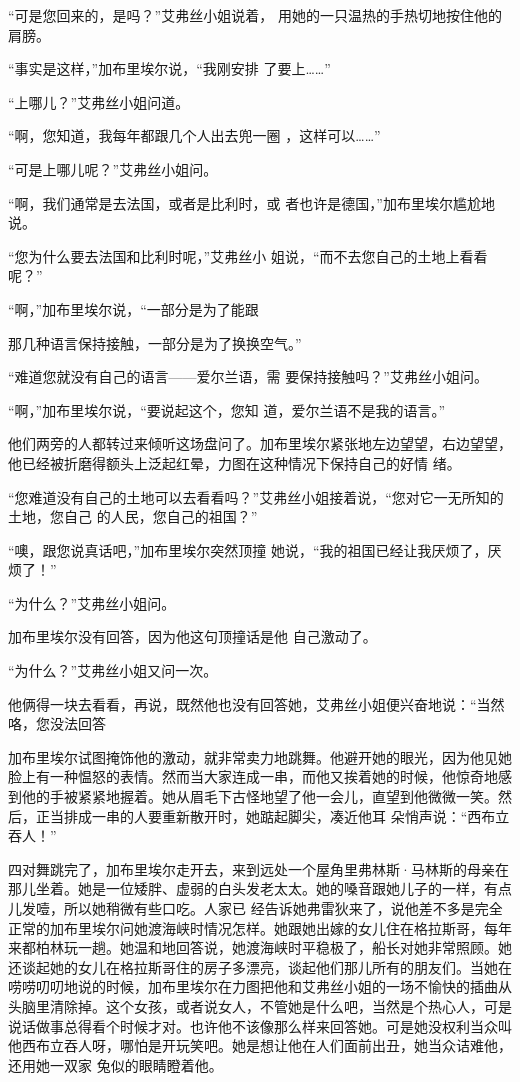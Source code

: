 \documentclass{article}
\begin{document}
“可是您回来的，是吗？”艾弗丝小姐说着，
用她的一只温热的手热切地按住他的肩膀。 

“事实是这样，”加布里埃尔说，“我刚安排
了要上……” 


“上哪儿？”艾弗丝小姐问道。 

“啊，您知道，我每年都跟几个人出去兜一圈
，这样可以……” 


“可是上哪儿呢？”艾弗丝小姐问。 

“啊，我们通常是去法国，或者是比利时，或
者也许是德国，”加布里埃尔尴尬地说。 

“您为什么要去法国和比利时呢，”艾弗丝小
姐说，“而不去您自己的土地上看看呢？” 

“啊，”加布里埃尔说，“一部分是为了能跟
\newpage

那几种语言保持接触，一部分是为了换换空气。” 

“难道您就没有自己的语言——爱尔兰语，需
要保持接触吗？”艾弗丝小姐问。 

“啊，”加布里埃尔说，“要说起这个，您知
道，爱尔兰语不是我的语言。” 

他们两旁的人都转过来倾听这场盘问了。加布里埃尔紧张地左边望望，右边望望，他已经被折磨得额头上泛起红晕，力图在这种情况下保持自己的好情
绪。 

“您难道没有自己的土地可以去看看吗？”艾弗丝小姐接着说，“您对它一无所知的土地，您自己
的人民，您自己的祖国？” 

“噢，跟您说真话吧，”加布里埃尔突然顶撞
她说，“我的祖国已经让我厌烦了，厌烦了！” 


\newpage

“为什么？”艾弗丝小姐问。 

加布里埃尔没有回答，因为他这句顶撞话是他
自己激动了。 


“为什么？”艾弗丝小姐又问一次。 

他俩得一块去看看，再说，既然他也没有回答她，艾弗丝小姐便兴奋地说：“当然咯，您没法回答

加布里埃尔试图掩饰他的激动，就非常卖力地跳舞。他避开她的眼光，因为他见她脸上有一种愠怒的表情。然而当大家连成一串，而他又挨着她的时候，他惊奇地感到他的手被紧紧地握着。她从眉毛下古怪地望了他一会儿，直望到他微微一笑。然后，正当排成一串的人要重新散开时，她踮起脚尖，凑近他耳
朵悄声说：“西布立吞人！” 

四对舞跳完了，加布里埃尔走开去，来到远处一个屋角里弗林斯·马林斯的母亲在那儿坐着。她是一位矮胖、虚弱的白头发老太太。她的嗓音跟她儿子的一样，有点儿发噎，所以她稍微有些口吃。人家已
\newpage
经告诉她弗雷狄来了，说他差不多是完全正常的加布里埃尔问她渡海峡时情况怎样。她跟她出嫁的女儿住在格拉斯哥，每年来都柏林玩一趟。她温和地回答说，她渡海峡时平稳极了，船长对她非常照顾。她还谈起她的女儿在格拉斯哥住的房子多漂亮，谈起他们那儿所有的朋友们。当她在唠唠叨叨地说的时候，加布里埃尔在力图把他和艾弗丝小姐的一场不愉快的插曲从头脑里清除掉。这个女孩，或者说女人，不管她是什么吧，当然是个热心人，可是说话做事总得看个时候才对。也许他不该像那么样来回答她。可是她没权利当众叫他西布立吞人呀，哪怕是开玩笑吧。她是想让他在人们面前出丑，她当众诘难他，还用她一双家
兔似的眼睛瞪着他。 
\end{document}
